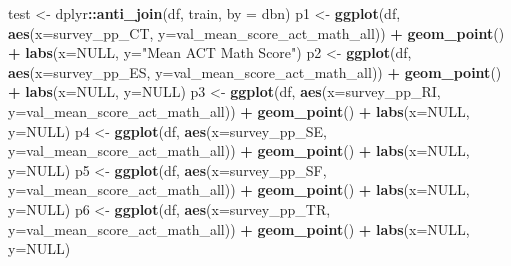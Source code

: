 \documentclass[
  man]{apa6}
\newenvironment{Shaded}{\begin{snugshade}}{\end{snugshade}}
\newcommand{\AttributeTok}[1]{\textcolor[rgb]{0.13,0.29,0.53}{#1}}
\newcommand{\ConstantTok}[1]{\textcolor[rgb]{0.56,0.35,0.01}{#1}}
\newcommand{\FunctionTok}[1]{\textcolor[rgb]{0.13,0.29,0.53}{\textbf{#1}}}
\newcommand{\NormalTok}[1]{#1}
\newcommand{\OtherTok}[1]{\textcolor[rgb]{0.56,0.35,0.01}{#1}}
\newcommand{\SpecialCharTok}[1]{\textcolor[rgb]{0.81,0.36,0.00}{\textbf{#1}}}
\newcommand{\StringTok}[1]{\textcolor[rgb]{0.31,0.60,0.02}{#1}}
\begin{document}
\begin{Shaded}
\begin{Highlighting}[]
\NormalTok{test  }\OtherTok{\textless{}{-}}\NormalTok{ dplyr}\SpecialCharTok{::}\FunctionTok{anti\_join}\NormalTok{(df, train, }\AttributeTok{by =} \StringTok{\textquotesingle{}dbn\textquotesingle{}}\NormalTok{)}
\NormalTok{p1 }\OtherTok{\textless{}{-}} \FunctionTok{ggplot}\NormalTok{(df, }\FunctionTok{aes}\NormalTok{(}\AttributeTok{x=}\NormalTok{survey\_pp\_CT, }\AttributeTok{y=}\NormalTok{val\_mean\_score\_act\_math\_all)) }\SpecialCharTok{+} \FunctionTok{geom\_point}\NormalTok{() }\SpecialCharTok{+} \FunctionTok{labs}\NormalTok{(}\AttributeTok{x=}\ConstantTok{NULL}\NormalTok{, }\AttributeTok{y=}\StringTok{"Mean ACT Math Score"}\NormalTok{)}
\NormalTok{p2 }\OtherTok{\textless{}{-}} \FunctionTok{ggplot}\NormalTok{(df, }\FunctionTok{aes}\NormalTok{(}\AttributeTok{x=}\NormalTok{survey\_pp\_ES, }\AttributeTok{y=}\NormalTok{val\_mean\_score\_act\_math\_all)) }\SpecialCharTok{+} \FunctionTok{geom\_point}\NormalTok{() }\SpecialCharTok{+} \FunctionTok{labs}\NormalTok{(}\AttributeTok{x=}\ConstantTok{NULL}\NormalTok{, }\AttributeTok{y=}\ConstantTok{NULL}\NormalTok{)}
\NormalTok{p3 }\OtherTok{\textless{}{-}} \FunctionTok{ggplot}\NormalTok{(df, }\FunctionTok{aes}\NormalTok{(}\AttributeTok{x=}\NormalTok{survey\_pp\_RI, }\AttributeTok{y=}\NormalTok{val\_mean\_score\_act\_math\_all)) }\SpecialCharTok{+} \FunctionTok{geom\_point}\NormalTok{() }\SpecialCharTok{+} \FunctionTok{labs}\NormalTok{(}\AttributeTok{x=}\ConstantTok{NULL}\NormalTok{, }\AttributeTok{y=}\ConstantTok{NULL}\NormalTok{)}
\NormalTok{p4 }\OtherTok{\textless{}{-}} \FunctionTok{ggplot}\NormalTok{(df, }\FunctionTok{aes}\NormalTok{(}\AttributeTok{x=}\NormalTok{survey\_pp\_SE, }\AttributeTok{y=}\NormalTok{val\_mean\_score\_act\_math\_all)) }\SpecialCharTok{+} \FunctionTok{geom\_point}\NormalTok{() }\SpecialCharTok{+} \FunctionTok{labs}\NormalTok{(}\AttributeTok{x=}\ConstantTok{NULL}\NormalTok{, }\AttributeTok{y=}\ConstantTok{NULL}\NormalTok{)}
\NormalTok{p5 }\OtherTok{\textless{}{-}} \FunctionTok{ggplot}\NormalTok{(df, }\FunctionTok{aes}\NormalTok{(}\AttributeTok{x=}\NormalTok{survey\_pp\_SF, }\AttributeTok{y=}\NormalTok{val\_mean\_score\_act\_math\_all)) }\SpecialCharTok{+} \FunctionTok{geom\_point}\NormalTok{() }\SpecialCharTok{+} \FunctionTok{labs}\NormalTok{(}\AttributeTok{x=}\ConstantTok{NULL}\NormalTok{, }\AttributeTok{y=}\ConstantTok{NULL}\NormalTok{)}
\NormalTok{p6 }\OtherTok{\textless{}{-}} \FunctionTok{ggplot}\NormalTok{(df, }\FunctionTok{aes}\NormalTok{(}\AttributeTok{x=}\NormalTok{survey\_pp\_TR, }\AttributeTok{y=}\NormalTok{val\_mean\_score\_act\_math\_all)) }\SpecialCharTok{+} \FunctionTok{geom\_point}\NormalTok{() }\SpecialCharTok{+} \FunctionTok{labs}\NormalTok{(}\AttributeTok{x=}\ConstantTok{NULL}\NormalTok{, }\AttributeTok{y=}\ConstantTok{NULL}\NormalTok{)}


\end{Highlighting}
\end{Shaded}
\end{document}
